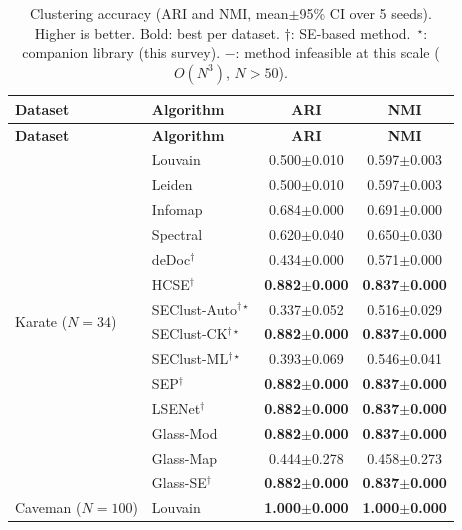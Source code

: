 {\scriptsize
\setlength{\tabcolsep}{4pt}
\renewcommand{\arraystretch}{0.9}
\begin{longtable}{@{}llcc@{}}
\caption{Clustering accuracy (ARI and NMI, mean$\pm$95\% CI over 5 seeds).
Higher is better. Bold: best per dataset.
$\dagger$: SE-based method.\ $^\star$: companion library (this survey).
$-$: method infeasible at this scale ($O(N^3)$, $N{>}50$).}
\label{tab:ari}\\
\toprule
\textbf{Dataset} & \textbf{Algorithm} & \textbf{ARI} & \textbf{NMI} \\
\midrule
\endfirsthead
\toprule
\textbf{Dataset} & \textbf{Algorithm} & \textbf{ARI} & \textbf{NMI} \\
\midrule
\endhead
\multirow{14}{*}{Karate ($N{=}34$)}
  & Louvain                     & 0.500$\pm$0.010 & 0.597$\pm$0.003 \\
  & Leiden                      & 0.500$\pm$0.010 & 0.597$\pm$0.003 \\
  & Infomap                     & 0.684$\pm$0.000 & 0.691$\pm$0.000 \\
  & Spectral                    & 0.620$\pm$0.040 & 0.650$\pm$0.030 \\
  & deDoc$^\dagger$              & 0.434$\pm$0.000 & 0.571$\pm$0.000 \\
  & HCSE$^\dagger$              & \textbf{0.882$\pm$0.000} & \textbf{0.837$\pm$0.000} \\
  & SEClust-Auto$^{\dagger\star}$ & 0.337$\pm$0.052 & 0.516$\pm$0.029 \\
  & SEClust-CK$^{\dagger\star}$  & \textbf{0.882$\pm$0.000} & \textbf{0.837$\pm$0.000} \\
  & SEClust-ML$^{\dagger\star}$  & 0.393$\pm$0.069 & 0.546$\pm$0.041 \\
  & SEP$^\dagger$               & \textbf{0.882$\pm$0.000} & \textbf{0.837$\pm$0.000} \\
  & LSENet$^\dagger$            & \textbf{0.882$\pm$0.000} & \textbf{0.837$\pm$0.000} \\
  & Glass-Mod                   & \textbf{0.882$\pm$0.000} & \textbf{0.837$\pm$0.000} \\
  & Glass-Map                   & 0.444$\pm$0.278 & 0.458$\pm$0.273 \\
  & Glass-SE$^\dagger$          & \textbf{0.882$\pm$0.000} & \textbf{0.837$\pm$0.000} \\
\midrule
\multirow{14}{*}{Caveman ($N{=}100$)}
  & Louvain                     & \textbf{1.000$\pm$0.000} & \textbf{1.000$\pm$0.000} \\

\end{longtable}}

